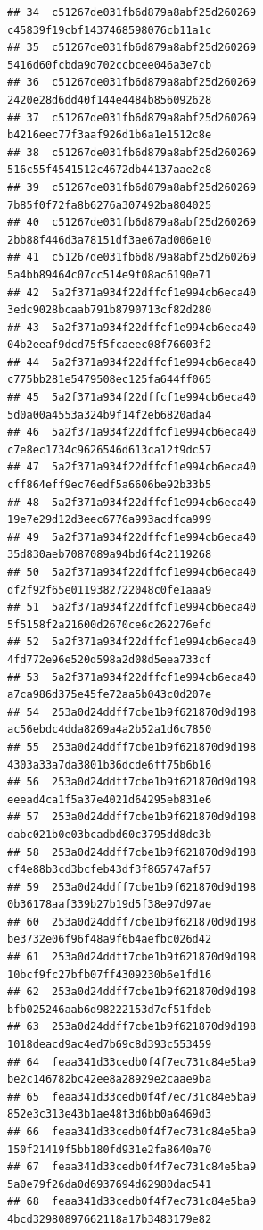 \documentclass[]{article}
\begin{document}
\begin{verbatim}
## 34  c51267de031fb6d879a8abf25d260269   c45839f19cbf1437468598076cb11a1c
## 35  c51267de031fb6d879a8abf25d260269   5416d60fcbda9d702ccbcee046a3e7cb
## 36  c51267de031fb6d879a8abf25d260269   2420e28d6dd40f144e4484b856092628
## 37  c51267de031fb6d879a8abf25d260269   b4216eec77f3aaf926d1b6a1e1512c8e
## 38  c51267de031fb6d879a8abf25d260269   516c55f4541512c4672db44137aae2c8
## 39  c51267de031fb6d879a8abf25d260269   7b85f0f72fa8b6276a307492ba804025
## 40  c51267de031fb6d879a8abf25d260269   2bb88f446d3a78151df3ae67ad006e10
## 41  c51267de031fb6d879a8abf25d260269   5a4bb89464c07cc514e9f08ac6190e71
## 42  5a2f371a934f22dffcf1e994cb6eca40   3edc9028bcaab791b8790713cf82d280
## 43  5a2f371a934f22dffcf1e994cb6eca40   04b2eeaf9dcd75f5fcaeec08f76603f2
## 44  5a2f371a934f22dffcf1e994cb6eca40   c775bb281e5479508ec125fa644ff065
## 45  5a2f371a934f22dffcf1e994cb6eca40   5d0a00a4553a324b9f14f2eb6820ada4
## 46  5a2f371a934f22dffcf1e994cb6eca40   c7e8ec1734c9626546d613ca12f9dc57
## 47  5a2f371a934f22dffcf1e994cb6eca40   cff864eff9ec76edf5a6606be92b33b5
## 48  5a2f371a934f22dffcf1e994cb6eca40   19e7e29d12d3eec6776a993acdfca999
## 49  5a2f371a934f22dffcf1e994cb6eca40   35d830aeb7087089a94bd6f4c2119268
## 50  5a2f371a934f22dffcf1e994cb6eca40   df2f92f65e0119382722048c0fe1aaa9
## 51  5a2f371a934f22dffcf1e994cb6eca40   5f5158f2a21600d2670ce6c262276efd
## 52  5a2f371a934f22dffcf1e994cb6eca40   4fd772e96e520d598a2d08d5eea733cf
## 53  5a2f371a934f22dffcf1e994cb6eca40   a7ca986d375e45fe72aa5b043c0d207e
## 54  253a0d24ddff7cbe1b9f621870d9d198   ac56ebdc4dda8269a4a2b52a1d6c7850
## 55  253a0d24ddff7cbe1b9f621870d9d198   4303a33a7da3801b36dcde6ff75b6b16
## 56  253a0d24ddff7cbe1b9f621870d9d198   eeead4ca1f5a37e4021d64295eb831e6
## 57  253a0d24ddff7cbe1b9f621870d9d198   dabc021b0e03bcadbd60c3795dd8dc3b
## 58  253a0d24ddff7cbe1b9f621870d9d198   cf4e88b3cd3bcfeb43df3f865747af57
## 59  253a0d24ddff7cbe1b9f621870d9d198   0b36178aaf339b27b19d5f38e97d97ae
## 60  253a0d24ddff7cbe1b9f621870d9d198   be3732e06f96f48a9f6b4aefbc026d42
## 61  253a0d24ddff7cbe1b9f621870d9d198   10bcf9fc27bfb07ff4309230b6e1fd16
## 62  253a0d24ddff7cbe1b9f621870d9d198   bfb025246aab6d98222153d7cf51fdeb
## 63  253a0d24ddff7cbe1b9f621870d9d198   1018deacd9ac4ed7b69c8d393c553459
## 64  feaa341d33cedb0f4f7ec731c84e5ba9   be2c146782bc42ee8a28929e2caae9ba
## 65  feaa341d33cedb0f4f7ec731c84e5ba9   852e3c313e43b1ae48f3d6bb0a6469d3
## 66  feaa341d33cedb0f4f7ec731c84e5ba9   150f21419f5bb180fd931e2fa8640a70
## 67  feaa341d33cedb0f4f7ec731c84e5ba9   5a0e79f26da0d6937694d62980dac541
## 68  feaa341d33cedb0f4f7ec731c84e5ba9   4bcd32980897662118a17b3483179e82

\end{verbatim}
\end{document}
